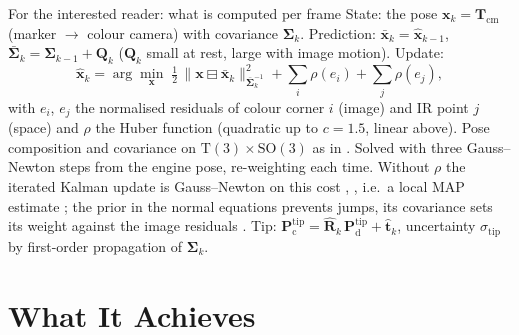 \documentclass[11pt,a4paper,fleqn]{article}
\newcommand{\Tcm}{\mathbf{T}_{\mathrm{cm}}}
\newcommand{\Ptd}{\mathbf{P}^{\mathrm{tip}}_{\mathrm{d}}}
\newcommand{\Ptc}{\mathbf{P}^{\mathrm{tip}}_{\mathrm{c}}}
\newcommand{\stip}{\sigma_{\mathrm{tip}}}
\begin{document}
\begin{mybox}{For the interested reader: what is computed per frame}
State: the pose $\mathbf{x}_k = \Tcm$ (marker $\to$ colour camera) with covariance $\boldsymbol{\Sigma}_k$.
Prediction: $\bar{\mathbf{x}}_k = \hat{\mathbf{x}}_{k-1}$, $\bar{\boldsymbol{\Sigma}}_k = \boldsymbol{\Sigma}_{k-1}
+ \mathbf{Q}_k$ ($\mathbf{Q}_k$ small at rest, large with image motion). Update:
\begin{equation*}
  \hat{\mathbf{x}}_k = \arg\min_{\mathbf{x}}\;
  \tfrac12\,\bigl\lVert \mathbf{x} \boxminus \bar{\mathbf{x}}_k \bigr\rVert^2_{\bar{\boldsymbol{\Sigma}}_k^{-1}}
  + \sum_i \rho(e_i) + \sum_j \rho(e_j),
\end{equation*}
with $e_i$, $e_j$ the normalised residuals of colour corner $i$ (image) and IR point $j$ (space) and $\rho$ the Huber
function (quadratic up to $c = 1.5$, linear above). Pose composition and covariance on
$\mathrm{T}(3)\times\mathrm{SO}(3)$ as in \cite[Ex.~7, Eqs.~51--52]{sola2018micro}. Solved with three
Gauss--Newton steps from the engine pose, re-weighting each time. Without $\rho$ the iterated Kalman update is
Gauss--Newton on this cost \cite{bell1993iterated}, \cite[p.~30]{lepetit2005monocular}, i.e.\ a local MAP estimate
\cite[§4.2.5--4.2.6]{barfoot2017state}; the prior in the normal equations prevents jumps, its covariance sets its
weight against the image residuals \cite[Sec.~IV-B]{kerl2013robust}. Tip: $\Ptc = \hat{\mathbf{R}}_k\,\Ptd +
\hat{\mathbf{t}}_k$, uncertainty $\stip$ by first-order propagation of $\boldsymbol{\Sigma}_k$.
\end{mybox}

\section{What It Achieves}
\label{sec:results}
\end{document}
